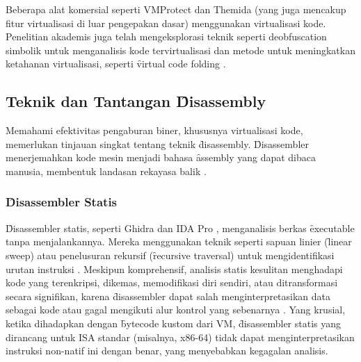 Beberapa alat komersial seperti VMProtect \cite{VMP24} dan Themida \cite{Ore24} (yang juga mencakup fitur virtualisasi di luar pengepakan dasar) menggunakan virtualisasi kode. Penelitian akademis juga telah mengeksplorasi teknik seperti deobfuscation simbolik untuk menganalisis kode tervirtualisasi \cite{Salwan2018SymbolicDeobfuscation} dan metode untuk meningkatkan ketahanan virtualisasi, seperti \f{virtual code folding} \cite{Don20}.

\subsection{Teknik dan Tantangan \f{Disassembly}}
Memahami efektivitas pengaburan biner, khususnya virtualisasi kode, memerlukan tinjauan singkat tentang teknik \f{disassembly}. \f{Disassembler} menerjemahkan kode mesin menjadi bahasa \f{assembly} yang dapat dibaca manusia, membentuk landasan rekayasa balik \cite{Sikorski2012}.

\subsubsection{\f{Disassembler} Statis}
\f{Disassembler} statis, seperti Ghidra \cite{Nat19} dan IDA Pro \cite{Hex91}, menganalisis berkas \f{executable} tanpa menjalankannya. Mereka menggunakan teknik seperti sapuan linier (\f{linear sweep}) atau penelusuran rekursif (\f{recursive traversal}) untuk mengidentifikasi urutan instruksi \cite{Eilam2011, Ko2007}. Meskipun komprehensif, analisis statis kesulitan menghadapi kode yang terenkripsi, dikemas, memodifikasi diri sendiri, atau ditransformasi secara signifikan, karena \f{disassembler} dapat salah menginterpretasikan data sebagai kode atau gagal mengikuti alur kontrol yang sebenarnya \cite{Sikorski2012, Blazytko2017}. Yang krusial, ketika dihadapkan dengan \f{bytecode} kustom dari VM, \f{disassembler} statis yang dirancang untuk ISA standar (misalnya, x86-64) tidak dapat menginterpretasikan instruksi non-natif ini dengan benar, yang menyebabkan kegagalan analisis.

